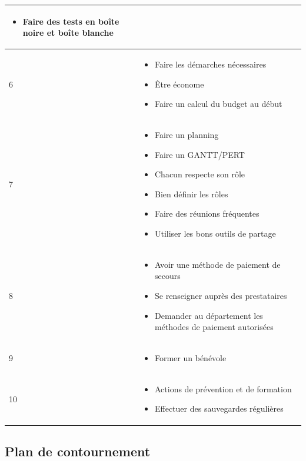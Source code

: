 \begin{longtable}{|p{7cm}|p{7cm}|}
\begin{itemize}
		\item Faire des tests en boîte noire et boîte blanche
	\end{itemize} \\
	\hline
	6 & \begin{itemize}
		\item Faire les démarches nécessaires
		\item Être économe
		\item Faire un calcul du budget au début
	\end{itemize} \\
	\hline
	7 & \begin{itemize}
		\item Faire un planning
		\item Faire un GANTT/PERT
		\item Chacun respecte son rôle
		\item Bien définir les rôles
		\item Faire des réunions fréquentes
		\item Utiliser les bons outils de partage
	\end{itemize} \\
	\hline
	8 & \begin{itemize}
		\item Avoir une méthode de paiement de secours
		\item Se renseigner auprès des prestataires
		\item Demander au département les méthodes de paiement autorisées
	\end{itemize} \\
	\hline
	9 & \begin{itemize}
		\item Former un bénévole
	\end{itemize} \\
	\hline
	10 & \begin{itemize}
		\item Actions de prévention et de formation
		\item Effectuer des sauvegardes régulières
	\end{itemize} \\
	\hline
	\end{longtable}

\subsection*{Plan de contournement}


